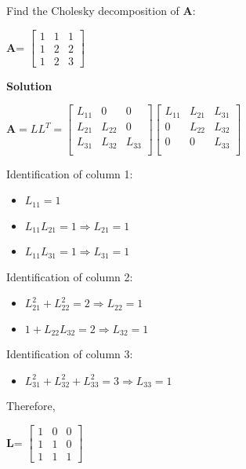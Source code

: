\begin{exercise}{7} %
Find the Cholesky decomposition of $\textbf{A}$:
\begin{center}
\textbf{A}= 
$\begin{bmatrix}
1&1&1\\ 
1&2&2\\
1&2&3
\end{bmatrix}
$ 
\end{center}
\textbf{Solution}\\
\begin{center}
$\textbf{A}= LL^T =  
\begin{bmatrix}
L_{11}&0&0\\ 
L_{21}&L_{22}&0\\
L_{31}&L_{32}&L_{33}\\
\end{bmatrix}
\begin{bmatrix}
L_{11}&L_{21}&L_{31}\\ 
0&L_{22}&L_{32}\\
0&0&L_{33}\\
\end{bmatrix}
$ 
\end{center}

Identification of column 1:
\begin{itemize}
\item $L_{11} = 1$
\item $L_{11}L_{21} = 1 \Rightarrow L_{21} = 1$
\item $L_{11}L_{31} = 1 \Rightarrow L_{31} = 1$
\end{itemize}

Identification of column 2:
\begin{itemize}
\item $L_{21}^2 + L_{22}^2 = 2 \Rightarrow L_{22} = 1$
\item $1+L_{22}L_{32} = 2 \Rightarrow L_{32} = 1$
\end{itemize}

Identification of column 3:
\begin{itemize}
\item $L_{31}^2 + L_{32}^2  + L_{33}^2 = 3 \Rightarrow L_{33} = 1$
\end{itemize}

Therefore,
\begin{center}
\textbf{L}= 
$\begin{bmatrix}
1&0&0\\ 
1&1&0\\
1&1&1
\end{bmatrix}
$ 
\end{center}

\end{exercise}
